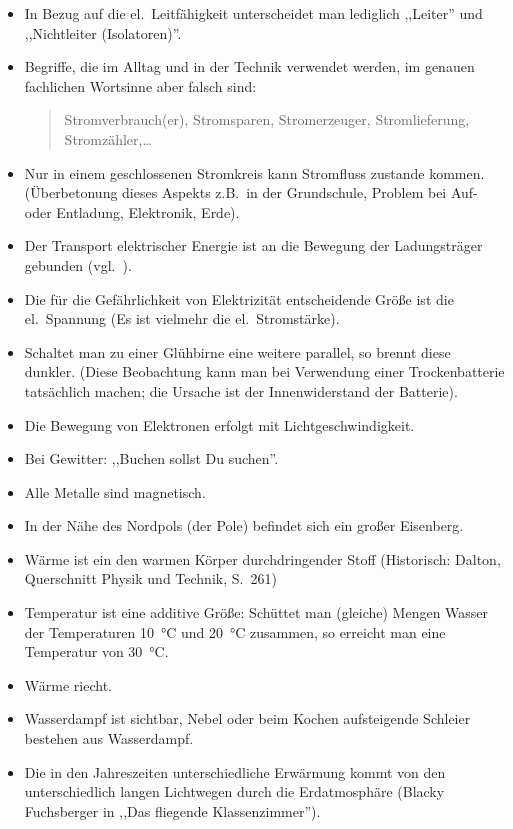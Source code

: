 \begin{itemize}
\item
In Bezug auf die el.\ Leitf\"{a}higkeit unterscheidet man lediglich ,,Leiter'' und ,,Nichtleiter (Isolatoren)''.

\item Begriffe, die im Alltag und in der Technik verwendet werden, im genauen
fachlichen Wortsinne aber falsch sind:
\begin{quote}
Stromverbrauch(er), Stromsparen,
Stromerzeuger,
Stromlieferung, Stromz\"{a}hler,\dots
\end{quote}

\item
Nur in einem geschlossenen Stromkreis kann Stromfluss zustande kommen.
(\"{U}berbetonung dieses Aspekts z.B.\ in der Grundschule, Problem bei Auf- oder Entladung, Elektronik, Erde).

\item
Der Transport elektrischer Energie ist an die Bewegung der
Ladungstr\"{a}ger gebunden (vgl.\ \cite{DuitEnergie}).
\item
Die f\"{u}r die Gef\"{a}hrlichkeit von Elektrizit\"{a}t entscheidende Gr\"{o}{\ss}e
ist die el.\ Spannung (Es ist vielmehr die el.\ Stromst\"{a}rke).
\item
Schaltet man zu einer Gl\"{u}hbirne eine weitere parallel, so
brennt diese dunkler. (Diese Beobachtung kann man bei
Verwendung einer Trockenbatterie tats\"{a}chlich machen; die
Ursache ist der Innenwiderstand der Batterie).
\item
Die Bewegung von Elektronen erfolgt mit Lichtgeschwindigkeit.
\item
Bei Gewitter: ,,Buchen sollst Du suchen''.
\item
Alle Metalle sind magnetisch.
\item
In der N\"{a}he des Nordpols (der Pole) befindet sich ein gro{\ss}er Eisenberg.
\end{itemize}


\begin{itemize}
\item
W\"{a}rme ist ein den warmen K\"{o}rper durchdringender Stoff
(Historisch: Dalton, Querschnitt Physik und Technik, S.\ 261)
\item
Temperatur ist eine additive Gr\"{o}{\ss}e: Sch\"{u}ttet man (gleiche)
Mengen Wasser der Temperaturen \SI{10}{\celsius} und \SI{20}{\celsius}
zusammen, so erreicht man eine Temperatur von \SI{30}{\celsius}.
\item
W\"{a}rme riecht.
\item
Wasserdampf ist sichtbar, Nebel oder beim Kochen aufsteigende Schleier bestehen aus Wasserdampf.
\item
Die in den Jahreszeiten unterschiedliche Erw\"{a}rmung kommt von den unterschiedlich langen
Lichtwegen durch die Erdatmosph\"{a}re (Blacky Fuchsberger in ,,Das fliegende Klassenzimmer'').
\end{itemize}

